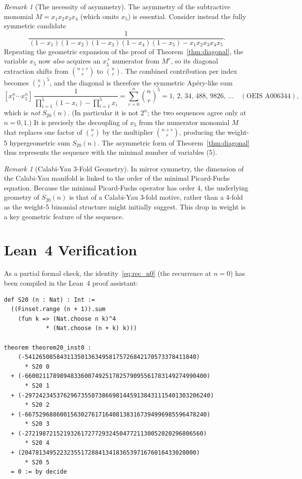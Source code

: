 \documentclass[12pt,reqno]{amsart}
\theoremstyle{plain}
\theoremstyle{definition}
\theoremstyle{remark}
\newtheorem{remark}[theorem]{Remark}
\begin{document}
\begin{remark}[The necessity of asymmetry]\label{rem:diag_comparison}
The asymmetry of the subtractive monomial $M = x_1 x_2 x_3 x_4$ (which omits
$x_5$) is essential. Consider instead the fully symmetric candidate
\[
\frac{1}{(1-x_1)(1-x_2)(1-x_3)(1-x_4)(1-x_5) - x_1 x_2 x_3 x_4 x_5}.
\]
Repeating the geometric expansion of the proof of Theorem~\ref{thm:diagonal},
the variable $x_5$ now \emph{also} acquires an $x_5^{\,r}$ numerator from $M^r$,
so its diagonal extraction shifts from $\binom{n+r}{r}$ to $\binom{n}{r}$. The
combined contribution per index becomes $\binom{n}{r}^{\!5}$, and the diagonal
is therefore the symmetric Ap\'ery-like sum
\[
[x_1^n \cdots x_5^n]\,
\frac{1}{\prod_{i=1}^5(1-x_i) - \prod_{i=1}^5 x_i}
= \sum_{r=0}^n \binom{n}{r}^{\!5}
= 1,\,2,\,34,\,488,\,9826,\,\dots \quad(\text{OEIS A006344}),
\]
which is \emph{not} $S_{20}(n)$. (In particular it is not $2^n$; the two
sequences agree only at $n=0,1$.) It is precisely the decoupling of $x_5$ from
the numerator monomial $M$ that replaces one factor of $\binom{n}{r}$ by the
multiplier $\binom{n+r}{r}$, producing the weight-5 hypergeometric sum
$S_{20}(n)$. The asymmetric form of Theorem~\ref{thm:diagonal} thus represents
the sequence with the minimal number of variables (5).
\end{remark}

\begin{remark}[Calabi-Yau 3-Fold Geometry]\label{rem:cy3fold}
In mirror symmetry, the dimension of the Calabi-Yau manifold is linked to the order of the minimal Picard-Fuchs equation. Because the minimal Picard-Fuchs operator has order 4, the underlying geometry of $S_{20}(n)$ is that of a Calabi-Yau 3-fold motive, rather than a 4-fold as the weight-5 binomial structure might initially suggest. This drop in weight is a key geometric feature of the sequence.
\end{remark}


\section{Lean~4 Verification}\label{sec:lean}

As a partial formal check, the identity~\eqref{eq:rec_n0}
(the recurrence at $n = 0$) has been compiled in the Lean~4
proof assistant:

\begin{verbatim}
def S20 (n : Nat) : Int :=
  ((Finset.range (n + 1)).sum
    (fun k => (Nat.choose n k)^4
            * (Nat.choose (n + k) k)))

theorem theorem20_inst0 :
    (-5412650858431135013634958175726842170573378411840)
      * S20 0
  + (-6600211789894833600749251782579095561783149274990400)
      * S20 1
  + (-29724234537629673550738669814459138431115401303206240)
      * S20 2
  + (-6675296886001563027617164081383167394996985596478240)
      * S20 3
  + (-272198721521932617277293245047721130052020296806560)
      * S20 4
  + (20478134952232355172884134183653971676016433020000)
      * S20 5
  = 0 := by decide
\end{verbatim}
\end{document}
